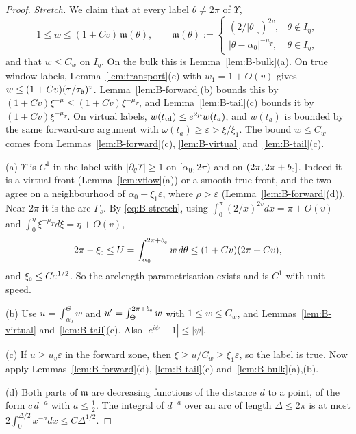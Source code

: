 \begin{proof}
\emph{Stretch.} We claim that at every label $\theta\ne2\pi$ of $\Upsilon$,
\begin{equation}\label{eq:B-stretch}
1\le w\le(1+Cv)\,\mathfrak m(\theta),\qquad \mathfrak m(\theta):=\begin{cases}(2/|\theta|_\circ)^{2v},&\theta\notin I_\eta,\\ |\theta-\alpha_0|^{-\mu_T},&\theta\in I_\eta,\end{cases}
\end{equation}
and that $w\le C_w$ on $I_\eta$. On the bulk this is Lemma~\ref{lem:B-bulk}(a). On true window labels, Lemma~\ref{lem:transport}(c)
with $w_1=1+O(v)$ gives $w\le(1+Cv)(\tau/\tau_{\mathfrak{b}})^v$. Lemma~\ref{lem:B-forward}(b) bounds this by $(1+Cv)\xi^{-\mu}\le(1+Cv)\xi^{-\mu_T}$,
and Lemma~\ref{lem:B-tail}(c) bounds it by $(1+Cv)\xi^{-\mu_T}$. On virtual labels, $w(t_{\mathrm{td}})\le e^{2\mu}w(t_a)$, and $w(t_a)$ is
bounded by the same forward-arc argument with $\omega(t_a)\ge\varepsilon>\xi/\xi_1$. The bound $w\le C_w$ comes from
Lemmas~\ref{lem:B-forward}(c), \ref{lem:B-virtual} and~\ref{lem:B-tail}(c).

(a) $\Upsilon$ is $C^1$ in the label with $|\partial_\theta\Upsilon|\ge1$ on $[\alpha_0,2\pi)$ and on $(2\pi,2\pi+b_{\mathrm{e}}]$. Indeed it is a virtual
front (Lemma~\ref{lem:vflow}(a)) or a smooth true front, and the two agree on a neighbourhood of $\alpha_0+\xi_1\varepsilon$, where
$\rho>\varepsilon$ (Lemma~\ref{lem:B-forward}(d)). Near $2\pi$ it is the arc $\Gamma_s$. By \eqref{eq:B-stretch}, using
$\int_0^\pi(2/x)^{2v}dx=\pi+O(v)$ and $\int_0^\eta\xi^{-\mu_T}d\xi=\eta+O(v)$,
\[
2\pi-\xi_{\mathrm{e}}\le U=\int_{\alpha_0}^{2\pi+b_{\mathrm{e}}}w\,d\theta\le(1+Cv)(2\pi+Cv),
\]
and $\xi_{\mathrm{e}}\le C\varepsilon^{1/2}$. So the arclength parametrisation exists and is $C^1$ with unit speed.

(b) Use $u=\int_{\alpha_0}^\Theta w$ and $u'=\int_\Theta^{2\pi+b_{\mathrm{e}}}w$ with $1\le w\le C_w$, and Lemmas~\ref{lem:B-virtual}
and~\ref{lem:B-tail}(c). Also $|e^{i\psi}-1|\le|\psi|$.

(c) If $u\ge u_v\varepsilon$ in the forward zone, then $\xi\ge u/C_w\ge\xi_1\varepsilon$, so the label is true. Now apply
Lemmas~\ref{lem:B-forward}(d), \ref{lem:B-tail}(c) and~\ref{lem:B-bulk}(a),(b).

(d) Both parts of $\mathfrak m$ are decreasing functions of the distance $d$ to a point, of the form $c\,d^{-a}$ with $a\le\frac12$. The
integral of $d^{-a}$ over an arc of length $\Delta\le2\pi$ is at most $2\int_0^{\Delta/2}x^{-a}dx\le C\Delta^{1/2}$.
\end{proof}

